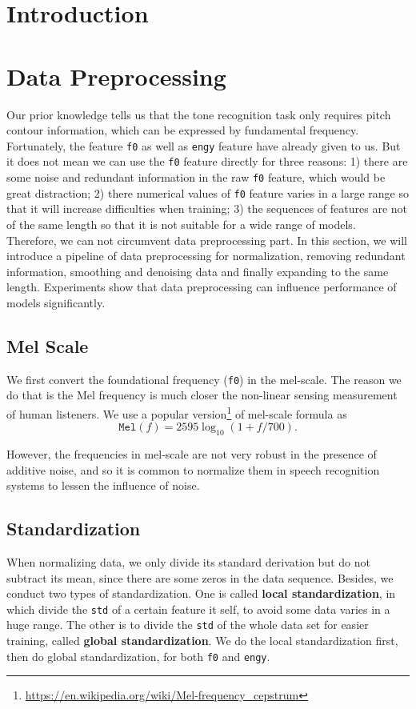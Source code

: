 \documentclass[a4paper]{article}
\begin{document}
\maketitle
\pagebreak

\section{Introduction}
\section{Data Preprocessing}

Our prior knowledge tells us that the tone recognition task only requires pitch contour information, which can be expressed by fundamental frequency. Fortunately, the feature \texttt{f0} as well as \texttt{engy} feature have already given to us. But it does not mean we can use the \texttt{f0} feature directly for three reasons: 1) there are some noise and redundant information in the raw \texttt{f0} feature, which would be great distraction; 2) there numerical values of \texttt{f0} feature varies in a large range so that it will increase difficulties when training; 3) the sequences of features are not of the same length so that it is not suitable for a wide range of models. Therefore, we can not circumvent data preprocessing part. In this section, we will introduce a pipeline of data preprocessing for normalization, removing redundant information, smoothing and denoising data and finally expanding to the same length. Experiments show that data preprocessing can influence performance of models significantly.
\subsection{Mel Scale}
We first convert the foundational frequency (\texttt{f0}) in the mel-scale. The reason we do that is the Mel frequency is much closer the non-linear sensing measurement of human listeners. We use a popular version\footnote{\url{https://en.wikipedia.org/wiki/Mel-frequency_cepstrum}} of mel-scale formula as
	\[\mathtt{Mel}(f) = 2595\log_{10}(1+f/ 700).\]
	
However, the frequencies in mel-scale are not very robust in the presence of additive noise, and so it is common to normalize them in speech recognition systems to lessen the influence of noise.
\subsection{Standardization}
When normalizing data, we only divide its standard derivation but do not subtract its mean, since there are some zeros in the data sequence. Besides, we conduct two types of standardization. One is called \textbf{local standardization}, in which divide the \texttt{std} of a certain feature it self, to avoid some data varies in a huge range. The other is to divide the \texttt{std} of the whole data set for easier training, called \textbf{global standardization}. We do the local standardization first, then do global standardization, for both \texttt{f0} and \texttt{engy}.
\end{document}
